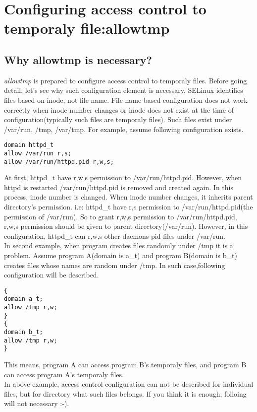 \documentclass{article}
\begin{document}
\section{Configuring access control to temporaly file:allowtmp}
\subsection{Why allowtmp is necessary?}
{\it allowtmp} is prepared to configure access control to temporaly
files.
Before going detail, let's see why such configuration element is necessary.
SELinux identifies files based on inode, not file name. File name based
configuration does not work correctly when inode number changes or inode
does not exist at the time of configuration(typically such files are
temporaly files).
Such files exist under  /var/run, /tmp, /var/tmp.
For example, assume following configuration exists.\\
\begin{verbatim}
domain httpd_t
allow /var/run r,s;
allow /var/run/httpd.pid r,w,s;
\end{verbatim}
At first, httpd\_t have r,w,s permission to /var/run/httpd.pid.
However, when httpd is restarted /var/run/httpd.pid is removed and
created again. In this process, inode number is changed. When inode
number changes, it inherits parent directory's permission. i.e:
 httpd\_t have r,s permission to /var/run/httpd.pid(the permission of
 /var/run). So to grant r,w,s permission to /var/run/httpd.pid, r,w,s
 permission should be given to parent directory(/var/run).
However, in this configuration, httpd\_t can r,w,s other daemons pid
files under /var/run. 
\\
In second example, when program creates files randomly under /tmp it is
a problem. Assume program  A(domain is a\_t) and program B(domain is
b\_t) creates files whose names are random under /tmp. In such
case,following configuration will be described.
\begin{verbatim}
{
domain a_t;
allow /tmp r,w;
}
{
domain b_t;
allow /tmp r,w;
}
\end{verbatim}
This means, program A can access program B's temporaly files, and
program B can access program A's temporaly files. \\
In above example, access control configuration can not be described for
individual files, but for directory what such files belongs.
If you think it is enough, folloing will not necessary :-).\\
\end{document}

